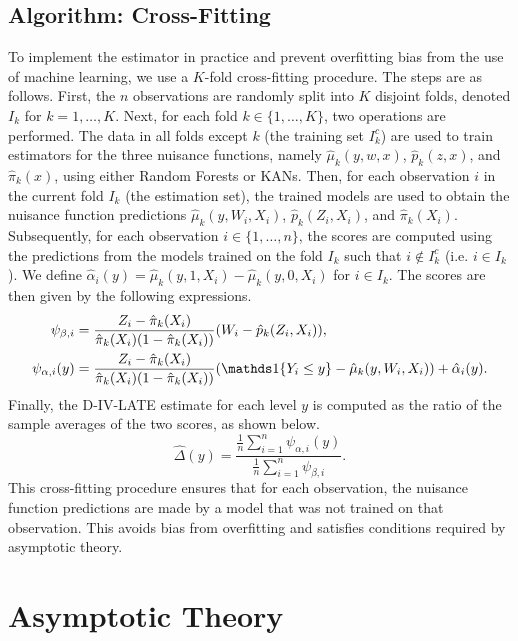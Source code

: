 \documentclass[final,3p,fleqn, 10pt]{elsarticle}
\begin{document}
\subsection{Algorithm: Cross-Fitting}
\label{subsec:cross_fitting_alg}
To implement the estimator in practice and prevent overfitting bias from the use of machine learning, we use a $K$-fold cross-fitting procedure. The steps are as follows.
First, the $n$ observations are randomly split into $K$ disjoint folds, denoted $I_k$ for $k=1, \dots, K$.
Next, for each fold $k \in \{1, \dots, K\}$, two operations are performed. The data in all folds except $k$ (the training set $I_k^c$) are used to train estimators for the three nuisance functions, namely $\hat{\mu}_k(y, w, x)$, $\hat{p}_k(z, x)$, and $\hat{\pi}_k(x)$, using either Random Forests or KANs. Then, for each observation $i$ in the current fold $I_k$ (the estimation set), the trained models are used to obtain the nuisance function predictions $\hat{\mu}_k(y, W_i, X_i)$, $\hat{p}_k(Z_i, X_i)$, and $\hat{\pi}_k(X_i)$.
Subsequently, for each observation $i \in \{1, \dots, n\}$, the scores are computed using the predictions from the models trained on the fold $I_k$ such that $i \notin I_k^c$ (i.e. $i \in I_k$). We define $\hat{\alpha}_i(y) = \hat{\mu}_k(y, 1, X_i) - \hat{\mu}_k(y, 0, X_i)$ for $i \in I_k$. The scores are then given by the following expressions.
    \begin{align*}
        \psi_{\beta, i} &= \frac{Z_i - \hat{\pi}_k(X_i)}{\hat{\pi}_k(X_i)(1-\hat{\pi}_k(X_i))} (W_i - \hat{p}_k(Z_i, X_i)), \\
        \psi_{\alpha, i}(y) &= \frac{Z_i - \hat{\pi}_k(X_i)}{\hat{\pi}_k(X_i)(1-\hat{\pi}_k(X_i))} (\ind\{Y_i \le y\} - \hat{\mu}_k(y, W_i, X_i)) + \hat{\alpha}_i(y).
    \end{align*}
Finally, the D-IV-LATE estimate for each level $y$ is computed as the ratio of the sample averages of the two scores, as shown below.
    $$ \hat{\Delta}(y) = \frac{\frac{1}{n}\sum_{i=1}^n \psi_{\alpha, i}(y)}{\frac{1}{n}\sum_{i=1}^n \psi_{\beta, i}}. $$
This cross-fitting procedure ensures that for each observation, the nuisance function predictions are made by a model that was not trained on that observation. This avoids bias from overfitting and satisfies conditions required by asymptotic theory.

\section{Asymptotic Theory}
\label{sec:asymptotics}
\end{document}
